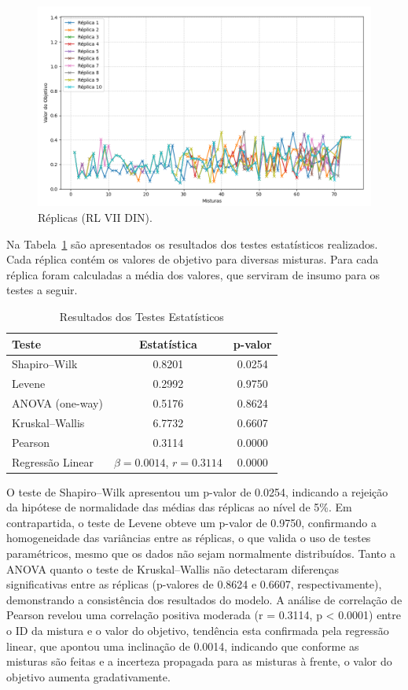 \documentclass[
    12pt,                %
    openright,           %
    oneside,             %
    a4paper,             %
    english,             %
    spanish,             %
    brazil               %
]{ufscar}
\begin{document}
\begin{figure}[hbt]
\centering
  \caption{Réplicas (RL VII DIN).}
  \label{figure:replicas}
  \includegraphics[width=1\textwidth]{figures/replicas.png}
\end{figure}

Na Tabela~\ref{tab:testes} são apresentados os resultados dos testes estatísticos realizados. Cada réplica contém os valores de objetivo para diversas misturas. Para cada réplica foram calculadas a média dos valores, que serviram de insumo para os testes a seguir.

\begin{table}[htp]
    \centering
    \caption{Resultados dos Testes Estatísticos}
    \label{tab:testes}
    \begin{tabular}{lcc}
    \toprule
    Teste & Estatística & p-valor \\
    \midrule
    Shapiro–Wilk     & 0.8201  & 0.0254 \\
    Levene           & 0.2992  & 0.9750 \\
    ANOVA (one-way)  & 0.5176  & 0.8624 \\
    Kruskal–Wallis   & 6.7732  & 0.6607 \\
    Pearson          & 0.3114  & 0.0000 \\
    Regressão Linear & \(\beta = 0.0014\), \(r = 0.3114\) & 0.0000 \\
    \bottomrule
    \end{tabular}
\end{table}

O teste de Shapiro–Wilk apresentou um p-valor de 0.0254, indicando a rejeição da hipótese de normalidade das médias das réplicas ao nível de 5\%. Em contrapartida, o teste de Levene obteve um p-valor de 0.9750, confirmando a homogeneidade das variâncias entre as réplicas, o que valida o uso de testes paramétricos, mesmo que os dados não sejam normalmente distribuídos. Tanto a ANOVA quanto o teste de Kruskal–Wallis não detectaram diferenças significativas entre as réplicas (p-valores de 0.8624 e 0.6607, respectivamente), demonstrando a consistência dos resultados do modelo. A análise de correlação de Pearson revelou uma correlação positiva moderada (r = 0.3114, p < 0.0001) entre o ID da mistura e o valor do objetivo, tendência esta confirmada pela regressão linear, que apontou uma inclinação de 0.0014, indicando que conforme as misturas são feitas e a incerteza propagada para as misturas à frente, o valor do objetivo aumenta gradativamente.
\end{document}
